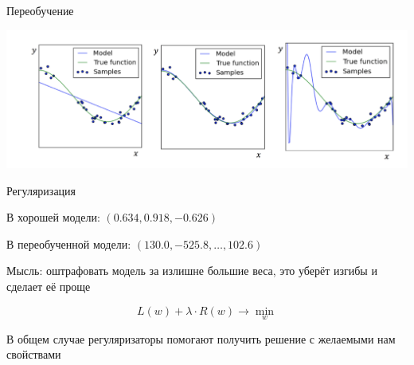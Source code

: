 \documentclass[notes,12pt, aspectratio=169]{beamer}
\newenvironment{wideitemize}{\itemize\addtolength{\itemsep}{10pt}}{\enditemize}
\begin{document}
\begin{frame}{Переобучение}
\begin{center}
	\includegraphics[width=0.9\paperwidth]{overfit.png}
\end{center}
\end{frame}

\begin{frame}{Регуляризация}
\begin{wideitemize}
	\item В хорошей модели: $(0.634, 0.918, -0.626)$
	\item В переобученной модели: $(130.0, -525.8, \ldots, 102.6)$
	\item Мысль: оштрафовать модель за излишне большие веса, это уберёт изгибы и сделает её проще
	
	\[
	L(w) + \lambda \cdot R(w) \to \min_{w}
	\]
	
	\item В общем случае регуляризаторы помогают получить решение с желаемыми нам свойствами
\end{wideitemize}
\end{frame}
\end{document}
